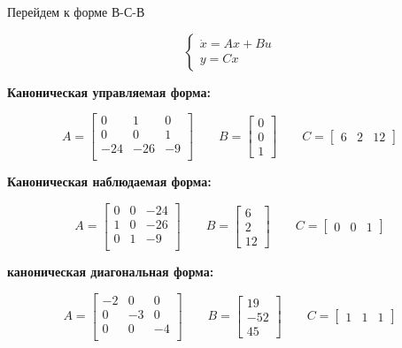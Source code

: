 \documentclass[a5paper, 10pt]{article}
\theoremstyle{definition}
\theoremstyle{plain}
\theoremstyle{remark}
\begin{document}
Перейдем к форме В-С-В

\[
\begin{cases}
    \dot x = Ax+Bu\\
    y=Cx
\end{cases}
\]

\textbf{Каноническая управляемая форма:}

$$
A=\begin{bmatrix}
    0 & 1 & 0 \\
    0 & 0 & 1 \\
    -24 & -26 & -9 \\
\end{bmatrix} \qquad B=\begin{bmatrix}
    0\\
    0\\
    1
\end{bmatrix} \qquad C=\begin{bmatrix}
    6 & 2 & 12
\end{bmatrix}
$$



\textbf{Каноническая наблюдаемая форма:}

$$
A=\begin{bmatrix}
    0 & 0 & -24 \\
    1 & 0 & -26 \\
    0 & 1 & -9 \\
\end{bmatrix} \qquad B=\begin{bmatrix}
    6\\
    2\\
    12
\end{bmatrix} \qquad C=\begin{bmatrix}
    0 & 0 & 1
\end{bmatrix}
$$

\textbf{каноническая диагональная форма:}

$$
A=\begin{bmatrix}
    -2 & 0 & 0 \\
    0 & -3 & 0 \\
    0 & 0 & -4 \\
\end{bmatrix} \qquad B=\begin{bmatrix}
    19\\
    -52\\
    45
\end{bmatrix} \qquad C=\begin{bmatrix}
    1 & 1 & 1
\end{bmatrix}
$$
\end{document}
